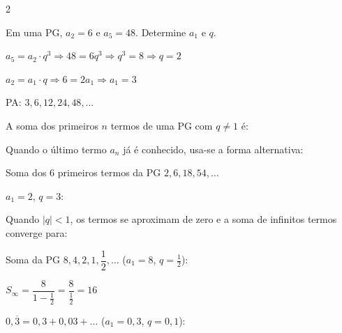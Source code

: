 \documentclass[12pt]{article}
\begin{document}
\begin{multicols}{2}

Em uma PG, $a_2 = 6$ e $a_5 = 48$. Determine $a_1$ e $q$.

$a_5 = a_2 \cdot q^3 \Rightarrow 48 = 6q^3 \Rightarrow q^3 = 8 \Rightarrow q = 2$

$a_2 = a_1 \cdot q \Rightarrow 6 = 2a_1 \Rightarrow \boxed{a_1 = 3}$

PA: $3, 6, 12, 24, 48, \ldots$


A soma dos primeiros $n$ termos de uma PG com $q \neq 1$ é:


Quando o último termo $a_n$ já é conhecido, usa-se a forma alternativa:




Soma dos 6 primeiros termos da PG $2, 6, 18, 54, \ldots$

$a_1 = 2$, $q = 3$:



Quando $|q| < 1$, os termos se aproximam de zero e a soma de infinitos termos
converge para:




Soma da PG $8, 4, 2, 1, \dfrac{1}{2}, \ldots$ \;($a_1 = 8$, $q = \frac{1}{2}$):

$S_\infty = \dfrac{8}{1 - \frac{1}{2}} = \dfrac{8}{\frac{1}{2}} = \boxed{16}$


$0{,}\overline{3} = 0{,}3 + 0{,}03 + \ldots$ \;($a_1 = 0{,}3$, $q = 0{,}1$):


\end{multicols}
\end{document}
